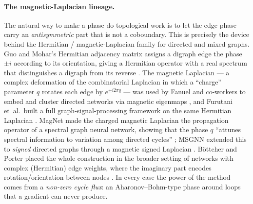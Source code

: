 \paragraph{The magnetic-Laplacian lineage.}
The natural way to make a phase do topological work is to let the edge phase
carry an \emph{antisymmetric} part that is not a coboundary. This is precisely
the device behind the Hermitian / magnetic-Laplacian family for directed and
mixed graphs. Guo and Mohar's Hermitian adjacency matrix assigns a digraph edge
the phase $\pm i$ according to its orientation, giving a Hermitian operator with
a real spectrum that distinguishes a digraph from its reverse
\citep{guo2017hermitian}. The magnetic Laplacian --- a complex deformation of
the combinatorial Laplacian in which a ``charge'' parameter $q$ rotates each edge
by $e^{\pm i 2\pi q}$ --- was used by Fanuel and co-workers to embed and cluster
directed networks via magnetic eigenmaps
\citep{fanuel2017magnetic,fanuel2018magnetic}, and Furutani et~al.\ built a full
graph-signal-processing framework on the same Hermitian Laplacian
\citep{furutani2019graph}. MagNet made the charged magnetic Laplacian the
propagation operator of a spectral graph neural network, showing that the phase
$q$ ``attunes spectral information to variation among directed cycles''
\citep{zhang2021magnet}; MSGNN extended this to \emph{signed} directed graphs
through a magnetic signed Laplacian \citep{he2022msgnn}. B\"ottcher and Porter
placed the whole construction in the broader setting of networks with complex
(Hermitian) edge weights, where the imaginary part encodes rotation/orientation
between nodes \citep{bottcher2024complex}. In every case the power of the method
comes from a \emph{non-zero cycle flux}: an Aharonov--Bohm-type phase around
loops that a gradient can never produce.

